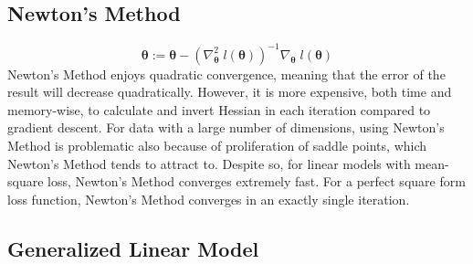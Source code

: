 \documentclass{article}
\renewcommand{\pmb}[1]{\boldsymbol{#1}}
\newcommand{\grad}[1]{\nabla_{#1}\;}
\newcommand{\gradn}[2]{\nabla_{#1}^{#2}\;}
\newcommand{\newpara}{\newline\newline}
\begin{document}
\subsection{Newton's Method}
$$\pmb\theta := \pmb\theta - (\gradn{\pmb{\theta}}{2} l(\pmb{\theta}))^{-1} \grad{\pmb\theta} l(\pmb\theta)$$
Newton's Method enjoys quadratic convergence, meaning that the error of the result will decrease quadratically. However, it is more expensive, both time and memory-wise, to calculate and invert Hessian in each iteration compared to gradient descent. For data with a large number of dimensions, using Newton's Method is problematic also because of proliferation of saddle points, which Newton's Method tends to attract to. \newpara
Despite so, for linear models with mean-square loss, Newton's Method converges extremely fast. For a perfect square form loss function, Newton's Method converges in an exactly single iteration.

\subsection{Generalized Linear Model}
\end{document}
